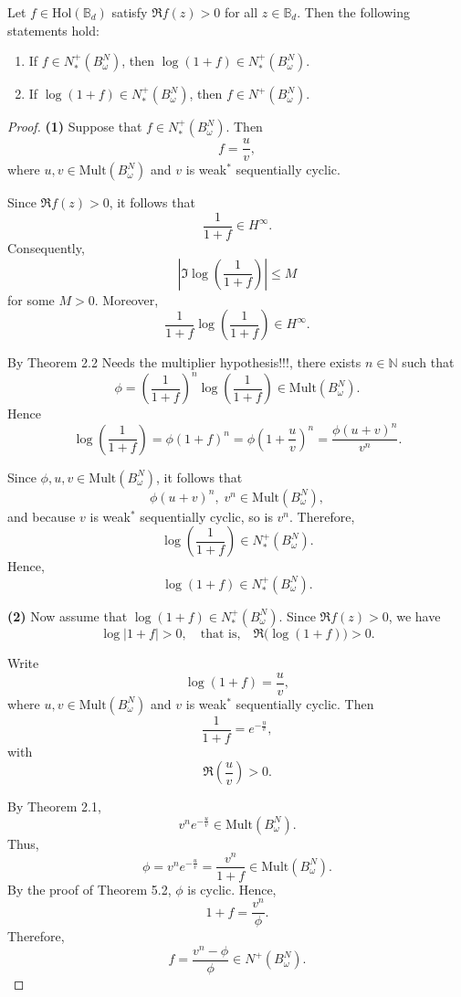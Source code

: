 \documentclass[10pt,a4paper]{amsart}
\begin{document}
\begin{thm}
Let $f \in \mathrm{Hol}(\mathbb{B}_{d})$ satisfy $\Re f(z) > 0$ for all $z \in \mathbb{B}_{d}$. Then the following statements hold:
\begin{enumerate}
    \item If $f \in N^{+}_{*}(B^{N}_{\omega})$, then $\log(1+f) \in N^{+}_{*}(B^{N}_{\omega})$.
    \item If $\log(1+f) \in N^{+}_{*}(B^{N}_{\omega})$, then $f \in N^{+}(B^{N}_{\omega})$.
\end{enumerate}
\end{thm}

\begin{proof}
\textbf{(1)} Suppose that $f \in N^{+}_{*}(B^{N}_{\omega})$. Then
\[
f = \frac{u}{v},
\]
where $u, v \in \mathrm{Mult}(B^{N}_{\omega})$ and $v$ is weak$^\ast$ sequentially cyclic.

Since $\Re f(z) > 0$, it follows that
\[
\frac{1}{1+f} \in H^{\infty}.
\]
Consequently,
\[
\left| \Im \log\!\left(\frac{1}{1+f}\right) \right| \leq M
\]
for some $M > 0$. Moreover,
\[
\frac{1}{1+f}\log\!\left(\frac{1}{1+f}\right) \in H^{\infty}.
\]

By Theorem 2.2 {\color{red} Needs the multiplier hypothesis!!!}, there exists $n \in \mathbb{N}$ such that
\[
\phi = \left(\frac{1}{1+f}\right)^{n}
\log\!\left(\frac{1}{1+f}\right)
\in \mathrm{Mult}(B^{N}_{\omega}).
\]
Hence
\[
\log\!\left(\frac{1}{1+f}\right)
=
\phi (1+f)^{n}
=
\phi \left(1 + \frac{u}{v}\right)^{n}
=
\frac{\phi (u+v)^{n}}{v^{n}}.
\]

Since $\phi, u, v \in \mathrm{Mult}(B^{N}_{\omega})$, it follows that
\[
\phi (u+v)^{n}, \; v^{n} \in \mathrm{Mult}(B^{N}_{\omega}),
\]
and because $v$ is weak$^\ast$ sequentially cyclic, so is $v^{n}$. Therefore,
\[
\log\!\left(\frac{1}{1+f}\right)
\in N^{+}_{*}(B^{N}_{\omega}).
\]
Hence,
\[
\log(1+f) \in N^{+}_{*}(B^{N}_{\omega}).
\]

\medskip

\textbf{(2)} Now assume that $\log(1+f) \in N^{+}_{*}(B^{N}_{\omega})$. Since $\Re f(z) > 0$, we have
\[
\log|1+f| > 0,
\quad \text{that is,} \quad
\Re\!\big(\log(1+f)\big) > 0.
\]

Write
\[
\log(1+f) = \frac{u}{v},
\]
where $u, v \in \mathrm{Mult}(B^{N}_{\omega})$ and $v$ is weak$^\ast$ sequentially cyclic. Then
\[
\frac{1}{1+f} = e^{-\frac{u}{v}},
\]
with
\[
\Re\!\left(\frac{u}{v}\right) > 0.
\]

By Theorem 2.1,
\[
v^{n} e^{-\frac{u}{v}} \in \mathrm{Mult}(B^{N}_{\omega}).
\]
Thus,
\[
\phi = v^{n} e^{-\frac{u}{v}} = \frac{v^{n}}{1+f}
\in \mathrm{Mult}(B^{N}_{\omega}).
\]
By the proof of Theorem 5.2, $\phi$ is cyclic. Hence,
\[
1+f = \frac{v^{n}}{\phi}.
\]
Therefore,
\[
f = \frac{v^{n} - \phi}{\phi}
\in N^{+}(B^{N}_{\omega}).
\]
\end{proof}
\end{document}
